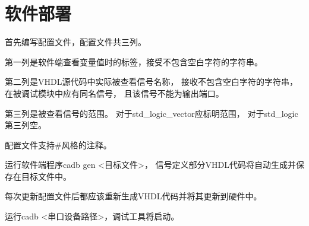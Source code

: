 \section{软件部署}
    首先编写配置文件，配置文件共三列。

    第一列是软件端查看变量值时的标签，接受不包含空白字符的字符串。

    第二列是VHDL源代码中实际被查看信号名称，%
    接收不包含空白字符的字符串，在被调试模块中应有同名信号，%
    且该信号不能为输出端口。

    第三列是被查看信号的范围。%
    对于std\_logic\_vector应标明范围，%
    对于std\_logic第三列空。

    配置文件支持\#风格的注释。

    运行软件端程序cadb gen <目标文件>，%
    信号定义部分VHDL代码将自动生成并保存在目标文件中。

    每次更新配置文件后都应该重新生成VHDL代码并将其更新到硬件中。

    运行cadb <串口设备路径>，调试工具将启动。

